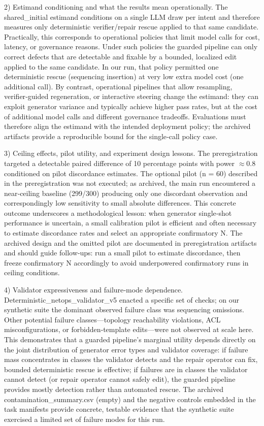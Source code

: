 \documentclass[conference]{IEEEtran}
\begin{document}
2) Estimand conditioning and what the results mean operationally. The shared\_initial estimand conditions on a single LLM draw per intent and therefore measures only deterministic verifier/repair rescue applied to that same candidate. Practically, this corresponds to operational policies that limit model calls for cost, latency, or governance reasons. Under such policies the guarded pipeline can only correct defects that are detectable and fixable by a bounded, localized edit applied to the same candidate. In our run, that policy permitted one deterministic rescue (sequencing insertion) at very low extra model cost (one additional call). By contrast, operational pipelines that allow resampling, verifier‑guided regeneration, or interactive steering change the estimand: they can exploit generator variance and typically achieve higher pass rates, but at the cost of additional model calls and different governance tradeoffs. Evaluations must therefore align the estimand with the intended deployment policy; the archived artifacts provide a reproducible bound for the single‑call policy case.

3) Ceiling effects, pilot utility, and experiment design lessons. The preregistration targeted a detectable paired difference of 10 percentage points with power \ensuremath{\approx}0.8 conditioned on pilot discordance estimates. The optional pilot (n = 60) described in the preregistration was not executed; as archived, the main run encountered a near‑ceiling baseline (299/300) producing only one discordant observation and correspondingly low sensitivity to small absolute differences. This concrete outcome underscores a methodological lesson: when generator single‑shot performance is uncertain, a small calibration pilot is efficient and often necessary to estimate discordance rates and select an appropriate confirmatory N. The archived design and the omitted pilot are documented in preregistration artifacts and should guide follow‑ups: run a small pilot to estimate discordance, then freeze confirmatory N accordingly to avoid underpowered confirmatory runs in ceiling conditions.

4) Validator expressiveness and failure‑mode dependence. Deterministic\_netops\_validator\_v5 enacted a specific set of checks; on our synthetic suite the dominant observed failure class was sequencing omissions. Other potential failure classes---topology reachability violations, ACL misconfigurations, or forbidden‑template edits---were not observed at scale here. This demonstrates that a guarded pipeline's marginal utility depends directly on the joint distribution of generator error types and validator coverage: if failure mass concentrates in classes the validator detects and the repair operator can fix, bounded deterministic rescue is effective; if failures are in classes the validator cannot detect (or repair operator cannot safely edit), the guarded pipeline provides mostly detection rather than automated rescue. The archived contamination\_summary.csv (empty) and the negative controls embedded in the task manifests provide concrete, testable evidence that the synthetic suite exercised a limited set of failure modes for this run.
\end{document}
